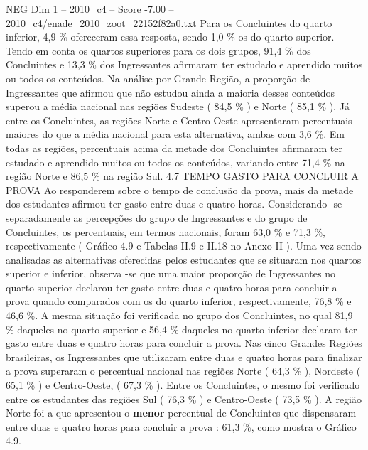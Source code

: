 \begin{textsample}{NEG Dim 1 – 2010\_c4 – Score -7.00 – 2010\_c4/enade\_2010\_zoot\_22152f82a0.txt}
Para os Concluintes do quarto inferior, 4,9 \% ofereceram essa resposta, sendo 1,0 \% os do quarto superior.
Tendo em conta os quartos superiores para os dois grupos, 91,4 \% dos Concluintes e 13,3 \% dos Ingressantes afirmaram ter estudado e aprendido muitos ou todos os conteúdos.
Na análise por Grande Região, a proporção de Ingressantes que afirmou que não estudou ainda a maioria desses conteúdos superou a média nacional nas regiões Sudeste ( 84,5 \% ) e Norte ( 85,1 \% ).
Já entre os Concluintes, as regiões Norte e Centro-Oeste apresentaram percentuais maiores do que a média nacional para esta alternativa, ambas com 3,6 \%.
Em todas as regiões, percentuais acima da metade dos Concluintes afirmaram ter estudado e aprendido muitos ou todos os conteúdos, variando entre 71,4 \% na região Norte e 86,5 \% na região Sul. 4.7 TEMPO GASTO PARA CONCLUIR A PROVA Ao responderem sobre o tempo de conclusão da prova, mais da metade dos estudantes afirmou ter gasto entre duas e quatro horas.
Considerando -se separadamente as percepções do grupo de Ingressantes e do grupo de Concluintes, os percentuais, em termos nacionais, foram 63,0 \% e 71,3 \%, respectivamente ( Gráfico 4.9 e Tabelas II.9 e II.18 no Anexo II ).
Uma vez sendo analisadas as alternativas oferecidas pelos estudantes que se situaram nos quartos superior e inferior, observa -se que uma maior proporção de Ingressantes no quarto superior declarou ter gasto entre duas e quatro horas para concluir a prova quando comparados com os do quarto inferior, respectivamente, 76,8 \% e 46,6 \%.
A mesma situação foi verificada no grupo dos Concluintes, no qual 81,9 \% daqueles no quarto superior e 56,4 \% daqueles no quarto inferior declaram ter gasto entre duas e quatro horas para concluir a prova.
Nas cinco Grandes Regiões brasileiras, os Ingressantes que utilizaram entre duas e quatro horas para finalizar a prova superaram o percentual nacional nas regiões Norte ( 64,3 \% ), Nordeste ( 65,1 \% ) e Centro-Oeste, ( 67,3 \% ).
Entre os Concluintes, o mesmo foi verificado entre os estudantes das regiões Sul ( 76,3 \% ) e Centro-Oeste ( 73,5 \% ).
A região Norte foi a que apresentou o \textbf{menor} percentual de Concluintes que dispensaram entre duas e quatro horas para concluir a prova : 61,3 \%, como mostra o Gráfico 4.9.

\end{textsample}
